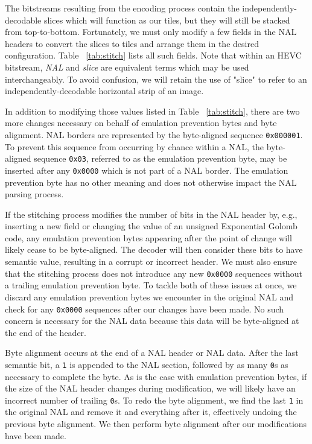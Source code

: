 The bitstreams resulting from the encoding process contain the independently-decodable slices which will function as our tiles, but they will still be stacked from top-to-bottom. Fortunately, we must only modify a few fields in the NAL headers to convert the slices to tiles and arrange them in the desired configuration. Table ~\ref{tab:stitch} lists all such fields. Note that within an HEVC bitstream, \textit{NAL} and \textit{slice} are equivalent terms which may be used interchangeably. To avoid confusion, we will retain the use of "slice" to refer to an independently-decodable horizontal strip of an image.

In addition to modifying those values listed in Table ~\ref{tab:stitch}, there are two more changes necessary on behalf of emulation prevention bytes and byte alignment. NAL borders are represented by the byte-aligned sequence \texttt{0x000001}. To prevent this sequence from occurring by chance within a NAL, the byte-aligned sequence \texttt{0x03}, referred to as the emulation prevention byte, may be inserted after any \texttt{0x0000} which is not part of a NAL border. The emulation prevention byte has no other meaning and does not otherwise impact the NAL parsing process.

If the stitching process modifies the number of bits in the NAL header by, e.g., inserting a new field or changing the value of an unsigned Exponential Golomb code, any emulation prevention bytes appearing after the point of change will likely cease to be byte-aligned. The decoder will then consider these bits to have semantic value, resulting in a corrupt or incorrect header. We must also ensure that the stitching process does not introduce any new \texttt{0x0000} sequences without a trailing emulation prevention byte. To tackle both of these issues at once, we discard any emulation prevention bytes we encounter in the original NAL and check for any \texttt{0x0000} sequences after our changes have been made. No such concern is necessary for the NAL data because this data will be byte-aligned at the end of the header.

Byte alignment occurs at the end of a NAL header or NAL data. After the last semantic bit, a \texttt{1} is appended to the NAL section, followed by as many \texttt{0}s as necessary to complete the byte. As is the case with emulation prevention bytes, if the size of the NAL header changes during modification, we will likely have an incorrect number of trailing \texttt{0}s. To redo the byte alignment, we find the last \texttt{1} in the original NAL and remove it and everything after it, effectively undoing the previous byte alignment. We then perform byte alignment after our modifications have been made.

